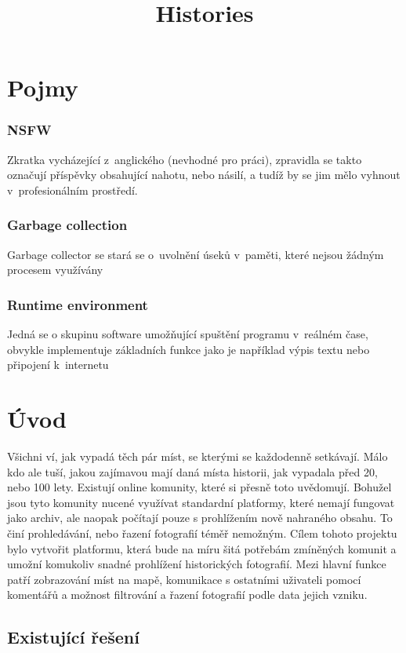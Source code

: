 \documentclass[12pt, a4paper,
  oneside,      %
]{report}
\title{Histories} %
\author{\name} %
\date{\publicationYear} %
\begin{document}
\pagestyle{empty}


\chapter{Pojmy}
\subsection{NSFW}
Zkratka vycházející z~anglického  (nevhodné pro práci), zpravidla se takto označují příspěvky obsahující nahotu, nebo násilí, a tudíž by se jim mělo vyhnout v~profesionálním prostředí. \cite{NSFW}

\subsection{Garbage collection} Garbage collector se stará se o~uvolnění úseků v~paměti, které nejsou žádným procesem využívány \cite{GarbageCollection}

\subsection{Runtime environment} Jedná se o skupinu software umožňující spuštění programu v~reálném čase, obvykle implementuje základních funkce jako je například výpis textu nebo připojení k~internetu \cite{whatIsRuntimeEnvironment}


\chapter{Úvod}
Všichni ví, jak vypadá těch pár míst, se kterými se každodenně setkávají. Málo kdo ale tuší, jakou zajímavou mají daná místa historii, jak vypadala před 20, nebo 100 lety. Existují online komunity, které si přesně toto uvědomují. Bohužel jsou tyto komunity nucené využívat standardní platformy, které nemají fungovat jako archiv, ale naopak počítají pouze s prohlížením nově nahraného obsahu. To činí prohledávání, nebo řazení fotografií téměř nemožným. Cílem tohoto projektu bylo vytvořit platformu, která bude na míru šitá potřebám zmíněných komunit a umožní komukoliv snadné prohlížení historických fotografií. Mezi hlavní funkce patří zobrazování míst na mapě, komunikace s ostatními uživateli pomocí komentářů a možnost filtrování a řazení fotografií podle data jejich vzniku. 

 
\section{Existující řešení}
\end{document}

